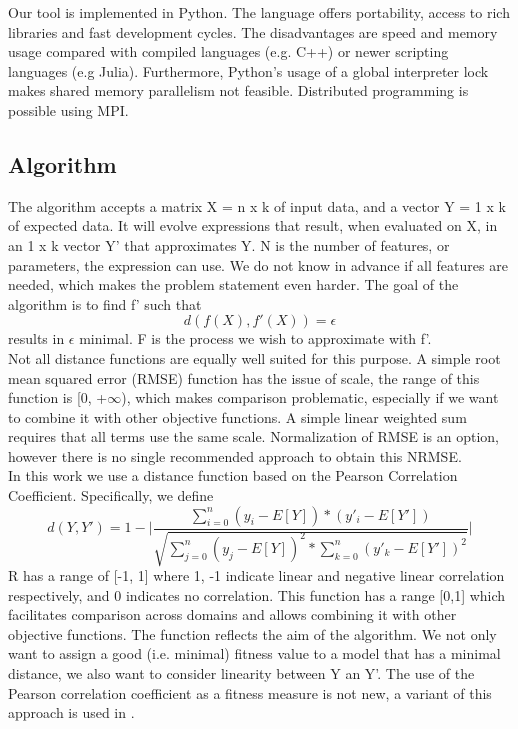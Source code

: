 Our tool is implemented in Python. The language offers portability, access to rich libraries and fast development cycles. The disadvantages are speed and memory usage compared with compiled languages (e.g. C++) or newer scripting languages (e.g Julia).
Furthermore, Python's usage of a global interpreter lock makes shared memory parallelism not feasible. Distributed programming is possible using MPI.
\subsection{Algorithm}
The algorithm accepts a matrix X = n x k of input data, and a vector Y = 1 x k of expected data. It will evolve expressions that result, when evaluated on X, in an 1 x k vector Y' that approximates Y. N is the number of features, or parameters, the expression can use. We do not know in advance if all features are needed, which makes the problem statement even harder.
The goal of the algorithm is to find f' such that
\[
d(f(X), f'(X))=\epsilon
\]
results in $\epsilon$ minimal. F is the process we wish to approximate with f'.\\
Not all distance functions are equally well suited for this purpose. A simple root mean squared error (RMSE) function has the issue of scale, the range of this function is [0, +$\infty$), which makes comparison problematic, especially if we want to combine it with other objective functions. A simple linear weighted sum requires that all terms use the same scale.
Normalization of RMSE is an option, however there is no single recommended approach to obtain this NRMSE. \\
In this work we use a distance function based on the Pearson Correlation Coefficient. Specifically, we define
\[
d(Y, Y') = 1 - 
\lvert \frac{\sum_{i=0}^{n}{(y_i-E[Y])*(y'_i-E[Y'])}}{\sqrt{\sum_{j=0}^{n}{(y_j-E[Y])^2}*\sum_{k=0}^{n}{(y'_k-E[Y'])^2}}}
 \lvert \]
R has a range of [-1, 1] where 1, -1 indicate linear and negative linear correlation respectively, and 0 indicates no correlation.
This function has a range [0,1] which facilitates comparison across domains and allows combining it with other objective functions.
The function reflects the aim of the algorithm. We not only want to assign a good (i.e. minimal) fitness value to a model that has a minimal distance, we also want to consider linearity between Y an Y'. The use of the Pearson correlation coefficient as a fitness measure is not new, a variant of this approach is used in \citep{pearson}.
